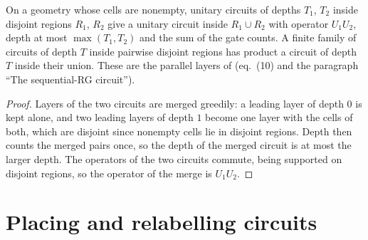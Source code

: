 \begin{theorem}
    \label{thm:unitary_parallel}
    \leanok
    On a geometry whose cells are nonempty, unitary circuits of depths $T_1$, $T_2$ inside
    disjoint regions $R_1$, $R_2$ give a unitary circuit inside $R_1\cup R_2$ with operator
    $U_1U_2$, depth at most $\max(T_1,T_2)$ and the sum of the gate counts. A finite family of
    circuits of depth $T$ inside pairwise disjoint regions has product a circuit of depth $T$
    inside their union. These are the parallel layers of \cite{Malz2024Preparation}
    (eq.~(10) and the paragraph ``The sequential-RG circuit'').
\end{theorem}
\begin{proof}\leanok
    Layers of the two circuits are merged greedily: a leading layer of depth $0$ is kept
    alone, and two leading layers of depth $1$ become one layer with the cells of both, which
    are disjoint since nonempty cells lie in disjoint regions. Depth then counts the merged
    pairs once, so the depth of the merged circuit is at most the larger depth. The operators
    of the two circuits commute, being supported on disjoint regions, so the operator of the
    merge is $U_1U_2$.
\end{proof}

\section{Placing and relabelling circuits}
\label{sec:unitary_placement}

